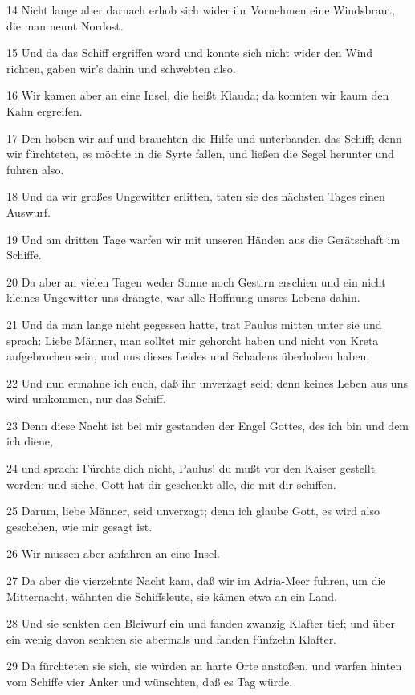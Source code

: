 \par 14 Nicht lange aber darnach erhob sich wider ihr Vornehmen eine Windsbraut, die man nennt Nordost.
\par 15 Und da das Schiff ergriffen ward und konnte sich nicht wider den Wind richten, gaben wir's dahin und schwebten also.
\par 16 Wir kamen aber an eine Insel, die heißt Klauda; da konnten wir kaum den Kahn ergreifen.
\par 17 Den hoben wir auf und brauchten die Hilfe und unterbanden das Schiff; denn wir fürchteten, es möchte in die Syrte fallen, und ließen die Segel herunter und fuhren also.
\par 18 Und da wir großes Ungewitter erlitten, taten sie des nächsten Tages einen Auswurf.
\par 19 Und am dritten Tage warfen wir mit unseren Händen aus die Gerätschaft im Schiffe.
\par 20 Da aber an vielen Tagen weder Sonne noch Gestirn erschien und ein nicht kleines Ungewitter uns drängte, war alle Hoffnung unsres Lebens dahin.
\par 21 Und da man lange nicht gegessen hatte, trat Paulus mitten unter sie und sprach: Liebe Männer, man solltet mir gehorcht haben und nicht von Kreta aufgebrochen sein, und uns dieses Leides und Schadens überhoben haben.
\par 22 Und nun ermahne ich euch, daß ihr unverzagt seid; denn keines Leben aus uns wird umkommen, nur das Schiff.
\par 23 Denn diese Nacht ist bei mir gestanden der Engel Gottes, des ich bin und dem ich diene,
\par 24 und sprach: Fürchte dich nicht, Paulus! du mußt vor den Kaiser gestellt werden; und siehe, Gott hat dir geschenkt alle, die mit dir schiffen.
\par 25 Darum, liebe Männer, seid unverzagt; denn ich glaube Gott, es wird also geschehen, wie mir gesagt ist.
\par 26 Wir müssen aber anfahren an eine Insel.
\par 27 Da aber die vierzehnte Nacht kam, daß wir im Adria-Meer fuhren, um die Mitternacht, wähnten die Schiffsleute, sie kämen etwa an ein Land.
\par 28 Und sie senkten den Bleiwurf ein und fanden zwanzig Klafter tief; und über ein wenig davon senkten sie abermals und fanden fünfzehn Klafter.
\par 29 Da fürchteten sie sich, sie würden an harte Orte anstoßen, und warfen hinten vom Schiffe vier Anker und wünschten, daß es Tag würde.
